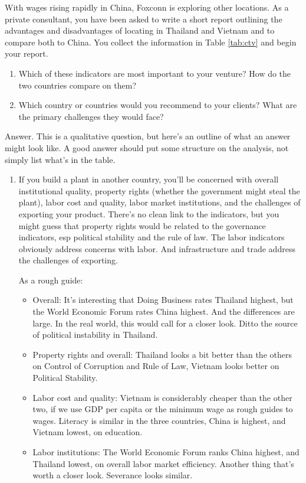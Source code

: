 \begin{enumerate}
With wages rising rapidly in China, Foxconn is exploring other locations.
As a private consultant, you have been asked to write a short report
outlining the advantages and disadvantages of locating in Thailand and Vietnam
and to compare both to China.
You collect the information in Table \ref{tab:ctv} and begin your report.

\begin{enumerate}
\item Which of these indicators are most important to your venture?
How do the two countries compare on them?
\item Which country or countries would you recommend to your clients?
What are the primary challenges they would face?
\end{enumerate}

Answer. 
This is a qualitative question, but here's an outline
of what an answer might look like.
A good answer should put some structure on the analysis,
not simply list what's in the table.

\begin{enumerate}
\item If you build a plant in another country, you'll be concerned
with overall institutional quality,
property rights (whether the government might steal the plant),
labor cost and quality,
labor market institutions,
and the challenges of exporting your product.
There's no clean link to the indicators, but you might guess that
property rights would be related to the governance indicators,
esp political stability and the rule of law.
The labor indicators obviously address concerns with labor.
And infrastructure and trade address the challenges of exporting.

As a rough guide:
\begin{itemize}
\item Overall:  It's interesting that Doing Business rates
Thailand highest, but the World Economic Forum rates China highest.
And the differences are large.  In the real world,
this would call for a closer look.
Ditto the source of political instability in Thailand.
\item Property rights and overall:  Thailand looks a bit better than the
others on Control of Corruption and Rule of Law, Vietnam looks better
on Political Stability.
\item Labor cost and quality:  Vietnam is considerably cheaper than the other two,
if we use GDP per capita or the minimum wage as rough guides to wages.
Literacy is similar in the three countries, China is highest, and Vietnam lowest,
on education.
\item Labor institutions:  The World Economic Forum ranks China highest,
and Thailand lowest, on overall labor market efficiency.
Another thing that's worth a closer look.
Severance looks similar.


\end{itemize}
\end{enumerate}
\end{enumerate}
